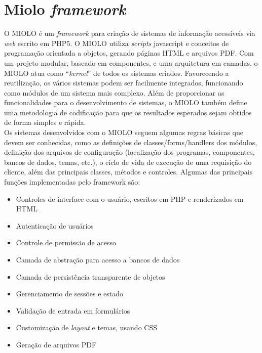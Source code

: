 \section{Miolo \textit{framework}}
O MIOLO é um \textit{framework} para criação de sistemas de informação 
acessíveis via \textit{web} escrito em PHP5. O MIOLO utiliza \textit{scripts} 
javascript e conceitos de programação orientada a objetos, gerando páginas HTML 
e arquivos PDF. Com um projeto modular, baseado em componentes, e uma 
arquitetura em camadas, o MIOLO atua como ``\textit{kernel}'' de todos os 
sistemas criados. Favorecendo a reutilização, os vários sistemas podem ser 
facilmente integrados, funcionando como módulos de um sistema mais complexo. 
Além de proporcionar as funcionalidades para o desenvolvimento de sistemas, o 
MIOLO também define uma metodologia de codificação para que os resultados 
esperados sejam obtidos de forma simples e rápida.\\
Os sistemas desenvolvidos com o MIOLO seguem algumas regras básicas que devem 
ser conhecidas, como as definições de classes/forms/handlers dos módulos, 
definição dos arquivos de configuração (localização dos programas, componentes, 
bancos de dados, temas, etc.), o ciclo de vida de execução de uma requisição do 
cliente, além das principais classes, métodos e controles. Algumas das 
principais funções implementadas pelo framework são:
\begin{itemize}
\item Controles de interface com o usuário, escritos em PHP e renderizados em 
HTML
\item Autenticação de usuários
\item Controle de permissão de acesso
\item Camada de abstração para acesso a bancos de dados
\item Camada de persistência transparente de objetos
\item Gerenciamento de sessões e estado
\item Validação de entrada em formulários
\item Customização de \textit{layout} e temas, usando CSS
\item Geração de arquivos PDF
\end{itemize}
